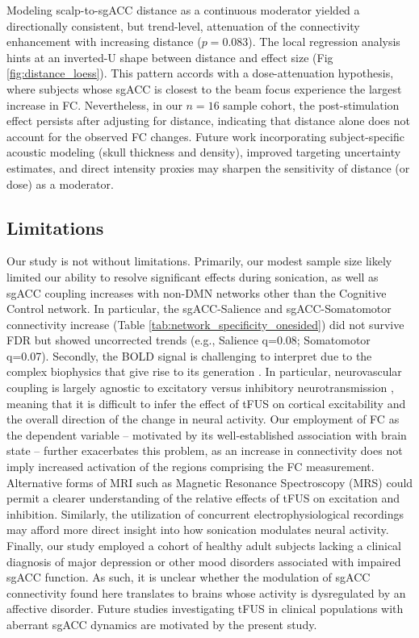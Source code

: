 Modeling scalp-to-sgACC distance as a continuous moderator yielded a directionally consistent, but trend-level, attenuation of the connectivity enhancement with increasing distance ($p=0.083$). The local regression analysis hints at an inverted-U shape between distance and effect size (Fig \ref{fig:distance_loess}). This pattern accords with a dose-attenuation hypothesis, where subjects whose sgACC is closest to the beam focus experience the largest increase in FC. Nevertheless, in our $n=16$ sample cohort, the post-stimulation effect persists after adjusting for distance, indicating that distance alone does not account for the observed FC changes. Future work incorporating subject-specific acoustic modeling (skull thickness and density), improved targeting uncertainty estimates, and direct intensity proxies may sharpen the sensitivity of distance (or dose) as a moderator.


\subsection*{Limitations}
\noindent
Our study is not without limitations. Primarily, our modest sample size likely limited our ability to resolve significant effects during sonication, as well as sgACC coupling increases with non-DMN networks other than the Cognitive Control network. In particular, the sgACC-Salience and sgACC-Somatomotor connectivity increase (Table \ref{tab:network_specificity_onesided}) did not survive FDR but showed uncorrected trends (e.g., Salience q=0.08; Somatomotor q=0.07). Secondly, the BOLD signal is challenging to interpret due to the complex biophysics that give rise to its generation \cite{buxton2013physics}. In particular, neurovascular coupling is largely agnostic to excitatory versus inhibitory neurotransmission \cite{logothetis2008we}, meaning that it is difficult to infer the effect of tFUS on cortical excitability and the overall direction of the change in neural activity. Our employment of FC as the dependent variable -- motivated by its well-established association with brain state -- further exacerbates this problem, as an increase in connectivity does not imply increased activation of the regions comprising the FC measurement. Alternative forms of MRI such as Magnetic Resonance Spectroscopy (MRS) \cite{yaakub2023transcranial} could permit a clearer understanding of the relative effects of tFUS on excitation and inhibition. Similarly, the utilization of concurrent electrophysiological recordings \cite{kim2023transcranial,mueller2014transcranial,kim2022neuromodulation,lee2016transcranial,min2011focused} may afford more direct insight into how sonication modulates neural activity. Finally, our study employed a cohort of healthy adult subjects lacking a clinical diagnosis of major depression or other mood disorders associated with impaired sgACC function. As such, it is unclear whether the modulation of sgACC connectivity found here translates to brains whose activity is dysregulated by an affective disorder. Future studies investigating tFUS in clinical populations with aberrant sgACC dynamics are motivated by the present study. 



